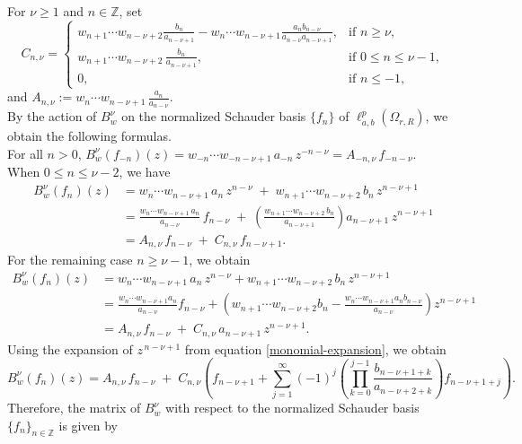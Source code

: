 \documentclass[12pt, reqno]{amsart}
\theoremstyle{definition}
\theoremstyle{remark}
\numberwithin{equation}{section}
\begin{document}
For $\nu \geq 1$ and $n \in \mathbb{Z}$, set 
\[
C_{n,\nu}=
\begin{cases}
w_{n+1}\cdots w_{n-\nu+2}\frac{b_{n}}{a_{n-\nu+1}}
 - w_{n}\cdots w_{n-\nu+1}\frac{a_{n}b_{n-\nu}}{a_{n-\nu} a_{n-\nu+1}}, 
 & \text{if } n\ge \nu,\\[0.4em]

w_{n+1}\cdots w_{n-\nu+2}\,\frac{b_{n}}{a_{n-\nu+1}}, 
 & \text{if } 0\leq n \leq \nu-1,\\[0.4em]

0, & \text{if } n\leq -1,
\end{cases}
\]
and $A_{n,\nu}
 := w_{n}\cdots w_{n-\nu+1}\,\frac{a_{n}}{a_{n-\nu}}.$\\ By the action of $B_w^\nu$ on the normalized Schauder basis $\{f_n\}$ of $\ell^{p}_{a,b}(\Omega_{r,R})$, we obtain the following formulas.\\
 For all $n>0$,
$
B_w^{\nu}(f_{-n})(z)
  = w_{-n}\cdots w_{-n-\nu+1}\, a_{-n}\, z^{-n-\nu} =A_{-n,\nu}\, f_{-n-\nu}.$\\
When $0 \le n \le \nu-2$, we have
\[
\begin{aligned}
B_w^{\nu}(f_{n})(z)
  &= w_{n}\cdots w_{n-\nu+1}\, a_{n}\, z^{n-\nu}
     \;+\;
     w_{n+1}\cdots w_{n-\nu+2}\, b_{n}\, z^{n-\nu+1} \\[6pt]
  &= \frac{w_{n}\cdots w_{n-\nu+1}\, a_{n}}{a_{n-\nu}}\,
       f_{n-\nu}
     \;+\;
     \left(
       \frac{w_{n+1}\cdots w_{n-\nu+2}\, b_{n}}{a_{n-\nu+1}}
     \right)
     a_{n-\nu+1}\, z^{n-\nu+1} \\[6pt]
  &= A_{n,\nu}\, f_{n-\nu}
     \;+\; C_{n,\nu}\, f_{n-\nu+1}.
\end{aligned}
\]
For the remaining case $n \ge \nu-1$, we obtain
\[
\begin{aligned}
B_w^{\nu}(f_{n})(z)
  &= w_{n}\cdots w_{n-\nu+1}\, a_{n}\, z^{n-\nu}+
     w_{n+1}\cdots w_{n-\nu+2}\, b_{n}\, z^{n-\nu+1} \\[6pt]
  &= \frac{w_{n}\cdots w_{n-\nu+1} a_{n}}{a_{n-\nu}}
       f_{n-\nu}+\left(w_{n+1}\cdots w_{n-\nu+2} b_{n}-\frac{w_{n}\cdots w_{n-\nu+1}a_{n} b_{n-\nu}}{a_{n-\nu}} \right)
     z^{n-\nu+1} \\[6pt]
  &= A_{n,\nu}\, f_{n-\nu}
     \;+\;
     C_{n,\nu}\, a_{n-\nu+1}\, z^{n-\nu+1}.
\end{aligned}
\]
Using the expansion of $z^{\,n-\nu+1}$ from equation \eqref{monomial-expansion}, we obtain
\[
B_{w}^{\nu}(f_{n})(z)
 = A_{n,\nu}\, f_{n-\nu}
   \;+\;
   C_{n,\nu}
   \left(
     f_{n-\nu+1}
     + \sum_{j=1}^{\infty}
         (-1)^{j}
         \left(
           \prod_{k=0}^{j-1}
           \frac{b_{n-\nu+1+k}}{a_{n-\nu+2+k}}
         \right)
         f_{n-\nu+1+j}
   \right).
\]
Therefore, the matrix of $B_{w}^{\nu}$ with respect to the normalized Schauder basis
$\{ f_n \}_{n \in \mathbb{Z}}$ is given by
\end{document}
